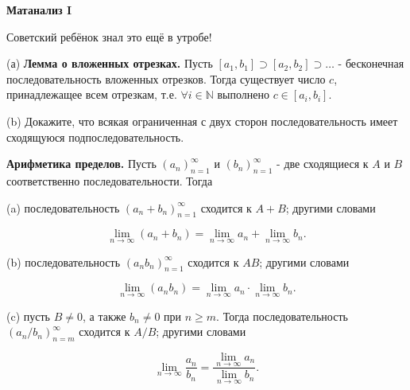 \centerline{\bf \Huge Матанализ I}

\begin{flushright}
        \scriptsize{Советский ребёнок знал это ещё в утробе!}
\end{flushright}

(а) \textbf{Лемма о вложенных отрезках.} Пусть $\left[a_1, b_1\right] \supset\left[a_2, b_2\right] \supset \ldots$ - бесконечная последовательность вложенных отрезков. Тогда существует число $c$, принадлежащее всем отрезкам, т.е. $\forall i \in \mathbb{N}$ выполнено $c \in\left[a_i, b_i\right]$.

(b) Докажите, что всякая ограниченная с двух сторон последовательность имеет сходящуюся подпоследовательность.


\textbf{Арифметика пределов.}
Пусть $\left(a_n\right)_{n=1}^{\infty}$ и $\left(b_n\right)_{n=1}^{\infty}$ - две сходящиеся к $A$ и $B$ соответственно последовательности. Тогда

(a) последовательность $\left(a_n+b_n\right)_{n=1}^{\infty}$ сходится к $A+B$; другими словами

$$
\lim _{n \rightarrow \infty}\left(a_n+b_n\right)=\lim _{n \rightarrow \infty} a_n+\lim _{n \rightarrow \infty} b_n .
$$

(b) последовательность $\left(a_n b_n\right)_{n=1}^{\infty}$ сходится к $A B$; другими словами

$$
\lim _{n \rightarrow \infty}\left(a_n b_n\right)=\lim _{n \rightarrow \infty} a_n \cdot \lim _{n \rightarrow \infty} b_n .
$$

(c) пусть $B \neq 0$, а также $b_n \neq 0$ при $n \geqslant m$. Тогда последовательность $\left(a_n / b_n\right)_{n=m}^{\infty}$ сходится к $A / B$; другими словами

$$
\lim _{n \rightarrow \infty} \frac{a_n}{b_n}=\frac{\lim _{n \rightarrow \infty} a_n}{\lim _{n \rightarrow \infty} b_n} .
$$